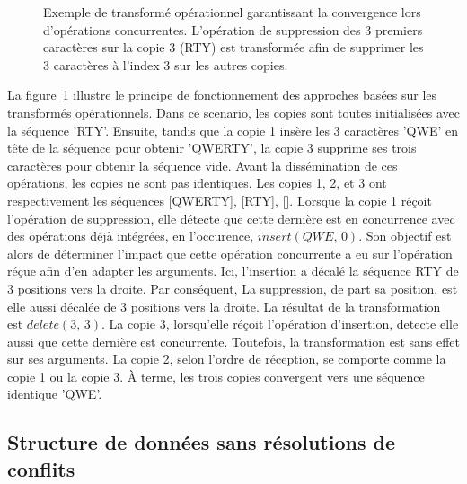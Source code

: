 \begin{figure}
  \centering
  
  \caption{\label{seq:fig:otexample}Exemple de transformé opérationnel
    garantissant la convergence lors d'opérations concurrentes. L'opération de
    suppression des 3 premiers caractères sur la copie 3 (RTY) est transformée
    afin de supprimer les 3 caractères à l'index 3 sur les autres copies.}
\end{figure}

La figure~\ref{seq:fig:otexample} illustre le principe de fonctionnement des
approches basées sur les transformés opérationnels. Dans ce scenario, les copies
sont toutes initialisées avec la séquence 'RTY'. Ensuite, tandis que la copie 1
insère les 3 caractères 'QWE' en tête de la séquence pour obtenir 'QWERTY', la
copie 3 supprime ses trois caractères pour obtenir la séquence vide. Avant la
dissémination de ces opérations, les copies ne sont pas identiques. Les copies
1, 2, et 3 ont respectivement les séquences [QWERTY], [RTY], []. Lorsque la
copie 1 réçoit l'opération de suppression, elle détecte que cette dernière est
en concurrence avec des opérations déjà intégrées, en l'occurence,
$insert(QWE,\,0)$. Son objectif est alors de déterminer l'impact que cette
opération concurrente a eu sur l'opération réçue afin d'en adapter les
arguments. Ici, l'insertion a décalé la séquence RTY de 3 positions vers la
droite. Par conséquent, La suppression, de part sa position, est elle aussi
décalée de 3 positions vers la droite. La résultat de la transformation est
$delete(3,\,3)$.  La copie 3, lorsqu'elle réçoit l'opération d'insertion,
detecte elle aussi que cette dernière est concurrente. Toutefois, la
transformation est sans effet sur ses arguments. La copie 2, selon l'ordre de
réception, se comporte comme la copie 1 ou la copie 3. À terme, les trois copies
convergent vers une séquence identique 'QWE'.


\subsection{Structure de données sans résolutions de conflits}


